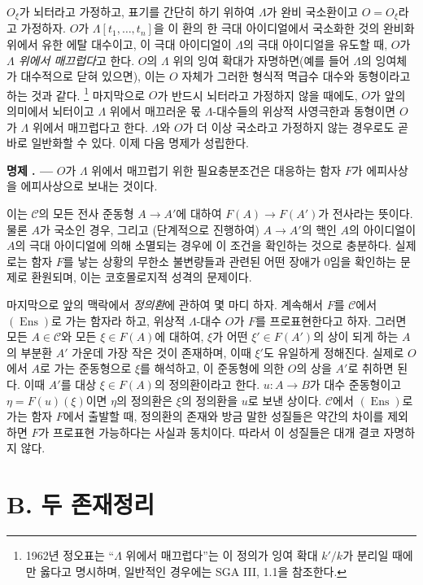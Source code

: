 \documentclass[11pt,twoside,openany]{book}
\numberwithin{equation}{section}
\theoremstyle{plain}
\theoremstyle{definition}
\theoremstyle{remark}
\newcommand{\fsection}[2]{%
  \section*{#1. #2}%
  \addcontentsline{toc}{section}{#1. #2}%
}
\newcommand{\result}[2]{%
  \par\medskip\noindent\textbf{#1%
  \if\relax\detokenize{#2}\relax\else\space#2\fi. ---}\enspace
}
\begin{document}
$O_\xi$가 뇌터라고 가정하고, 표기를 간단히 하기 위하여 $\Lambda$가 완비
국소환이고 $O=O_\xi$라고 가정하자. $O$가 $\Lambda[t_1,\ldots,t_n]$을
이 환의 한 극대 아이디얼에서 국소화한 것의 완비화 위에서 유한 에탈
대수이고, 이 극대 아이디얼이 $\Lambda$의 극대 아이디얼을 유도할 때,
$O$가 \emph{$\Lambda$ 위에서 매끄럽다}고 한다. $O$의 $\Lambda$ 위의 잉여
확대가 자명하면(예를 들어 $\Lambda$의 잉여체가 대수적으로 닫혀 있으면),
이는 $O$ 자체가 그러한 형식적 멱급수 대수와 동형이라고 하는 것과 같다.
\footnote{1962년 정오표는 ``$\Lambda$ 위에서 매끄럽다''는 이 정의가 잉여
확대 $k'/k$가 분리일 때에만 옳다고 명시하며, 일반적인 경우에는 SGA III,
1.1을 참조한다.}
마지막으로 $O$가 반드시 뇌터라고 가정하지 않을 때에도, $O$가 앞의
의미에서 뇌터이고 $\Lambda$ 위에서 매끄러운 몫 $\Lambda$-대수들의 위상적
사영극한과 동형이면 $O$가 $\Lambda$ 위에서 매끄럽다고 한다. $\Lambda$와
$O$가 더 이상 국소라고 가정하지 않는 경우로도 곧바로 일반화할 수 있다.
이제 다음 명제가 성립한다.

\result{명제}{5.2} $O$가 $\Lambda$ 위에서 매끄럽기 위한 필요충분조건은
대응하는 함자 $F$가 에피사상을 에피사상으로 보내는 것이다.

이는 $\mathcal C$의 모든 전사 준동형 $A\longrightarrow A'$에 대하여
$F(A)\longrightarrow F(A')$가 전사라는 뜻이다. 물론 $A$가 국소인 경우,
그리고 (단계적으로 진행하여) $A\longrightarrow A'$의 핵인 $A$의
아이디얼이 $A$의 극대 아이디얼에 의해 소멸되는 경우에 이 조건을
확인하는 것으로 충분하다. 실제로는 함자 $F$를 낳는 상황의 무한소
불변량들과 관련된 어떤 장애가 0임을 확인하는 문제로 환원되며, 이는
코호몰로지적 성격의 문제이다.

마지막으로 앞의 맥락에서 \emph{정의환}에 관하여 몇 마디 하자. 계속해서
$F$를 $\mathcal C$에서 $(\operatorname{Ens})$로 가는 함자라 하고, 위상적
$\Lambda$-대수 $O$가 $F$를 프로표현한다고 하자. 그러면 모든
$A\in\mathcal C$와 모든 $\xi\in F(A)$에 대하여, $\xi$가 어떤
$\xi'\in F(A')$의 상이 되게 하는 $A$의 부분환 $A'$ 가운데 가장 작은 것이
존재하며, 이때 $\xi'$도 유일하게 정해진다. 실제로 $O$에서 $A$로 가는
준동형으로 $\xi$를 해석하고, 이 준동형에 의한 $O$의 상을 $A'$로 취하면
된다. 이때 $A'$를 대상 $\xi\in F(A)$의 정의환이라고 한다.
$u:A\longrightarrow B$가 대수 준동형이고 $\eta=F(u)(\xi)$이면 $\eta$의
정의환은 $\xi$의 정의환을 $u$로 보낸 상이다. $\mathcal C$에서
$(\operatorname{Ens})$로 가는 함자 $F$에서 출발할 때, 정의환의 존재와
방금 말한 성질들은 약간의 차이를 제외하면 $F$가 프로표현 가능하다는
사실과 동치이다. 따라서 이 성질들은 대개 결코 자명하지 않다.

\fsection{B}{두 존재정리}
\end{document}
